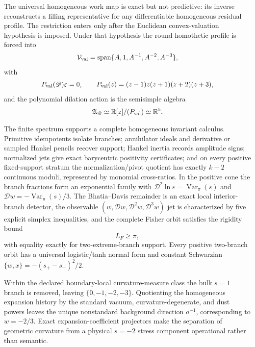 \documentclass[aps,prd,reprint,onecolumn,nofootinbib,superscriptaddress,showkeys]{revtex4-2}
\numberwithin{equation}{section}
\theoremstyle{definition}
\theoremstyle{plain}
\newcommand{\R}{\mathbb R}
\newcommand{\Dil}{\mathscr D}
\newcommand{\spanop}{\operatorname{span}}
\begin{document}
The universal homogeneous work map is exact but not predictive: its inverse reconstructs a filling representative for any differentiable homogeneous residual profile.  The restriction enters only after the Euclidean convex-valuation hypothesis is imposed.  Under that hypothesis the round homothetic profile is forced into
\begin{equation}
\mathcal V_{\rm val}=\spanop\{A,1,A^{-1},A^{-2},A^{-3}\},
\end{equation}
with
\begin{equation}
P_{\rm val}(\Dil)\varepsilon=0,
\qquad
P_{\rm val}(z)=(z-1)z(z+1)(z+2)(z+3),
\end{equation}
and the polynomial dilation action is the semisimple algebra
\begin{equation}
\mathfrak A_{\Dil}\simeq\R[z]/(P_{\rm val})\simeq\R^5.
\end{equation}

The finite spectrum supports a complete homogeneous invariant calculus.  Primitive idempotents isolate branches; annihilator ideals and derivative or sampled Hankel pencils recover support; Hankel inertia records amplitude signs; normalized jets give exact barycentric positivity certificates; and on every positive fixed-support stratum the normalization/pivot quotient has exactly \(k-2\) continuous moduli, represented by monomial cross-ratios.  In the positive cone the branch fractions form an exponential family with \(\Dil^2\ln\varepsilon=\operatorname{Var}_\pi(s)\) and \(\Dil w=-\operatorname{Var}_\pi(s)/3\).  The Bhatia--Davis remainder is an exact local interior-branch detector, the observable \((w,\Dil w,\Dil^2w,\Dil^3w)\) jet is characterized by five explicit simplex inequalities, and the complete Fisher orbit satisfies the rigidity bound
\begin{equation}
L_F\ge\pi,
\end{equation}
with equality exactly for two-extreme-branch support.  Every positive two-branch orbit has a universal logistic/tanh normal form and constant Schwarzian \(\{w,x\}=-(s_+-s_-)^2/2\).

Within the declared boundary-local curvature-measure class the bulk \(s=1\) branch is removed, leaving \(\{0,-1,-2,-3\}\).  Quotienting the homogeneous expansion history by the standard vacuum, curvature-degenerate, and dust powers leaves the unique nonstandard background direction \(a^{-1}\), corresponding to \(w=-2/3\).  Exact expansion-coefficient projectors make the separation of geometric curvature from a physical \(s=-2\) stress component operational rather than semantic.
\end{document}
